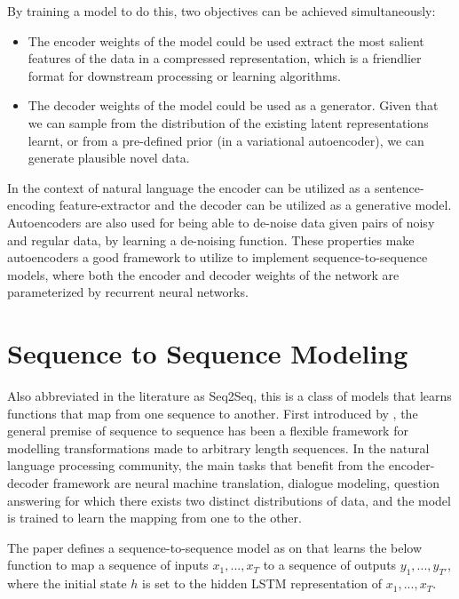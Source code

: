 By training a model to do this, two objectives can be achieved simultaneously:
\begin{itemize}
	\item The encoder weights of the model could be used extract the most salient features of the data in a compressed representation, which is a friendlier format for downstream processing or learning algorithms. \citep{hinton2006reducing}
	\item The decoder weights of the model could be used as a generator. Given that we can sample from the distribution of the existing latent representations learnt, or from a pre-defined prior (in a variational autoencoder), we can generate plausible novel data.
\end{itemize}

In the context of natural language the encoder can be utilized as a sentence-encoding feature-extractor and the decoder can be utilized as a generative model. Autoencoders are also used for being able to de-noise data given pairs of noisy and regular data, by learning a de-noising function. These properties make autoencoders a good framework to utilize to implement sequence-to-sequence models, where both the encoder and decoder weights of the network are parameterized by recurrent neural networks.



\section{Sequence to Sequence Modeling}

Also abbreviated in the literature as Seq2Seq, this is a class of models that learns functions that map from one sequence to another. First introduced by \cite{sutskever2014sequence}, the general premise of sequence to sequence has been a flexible framework for modelling transformations made to arbitrary length sequences. In the natural language processing community, the main tasks that benefit from the encoder-decoder framework are neural machine translation, dialogue modeling, question answering for which there exists two distinct distributions of data, and the model is trained to learn the mapping from one to the other.

The paper defines a sequence-to-sequence model as on that learns the below function to map a sequence of inputs $x_1, ... , x_T$ to a sequence of outputs $y_1, ... , y_{T′}$, where the initial state $h$ is set to the hidden LSTM representation of $x_1, ... , x_T$.

